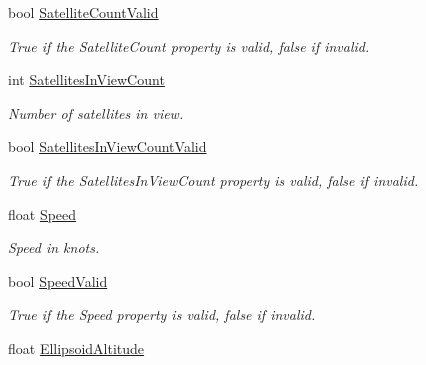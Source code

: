 \begin{DoxyCompactItemize}
bool \hyperlink{class_g_p_s_mobile_1_1_gps_position_af911c9eb00e8dab5c549e53748d3389a}{SatelliteCountValid}
\begin{DoxyCompactList}\small\item\em True if the SatelliteCount property is valid, false if invalid. \item\end{DoxyCompactList}\item 
int \hyperlink{class_g_p_s_mobile_1_1_gps_position_af125dc9f8b26690269c08483d1b7ffb0}{SatellitesInViewCount}
\begin{DoxyCompactList}\small\item\em Number of satellites in view. \item\end{DoxyCompactList}\item 
bool \hyperlink{class_g_p_s_mobile_1_1_gps_position_a3a358ef10fea4c956bc5db879a18e89d}{SatellitesInViewCountValid}
\begin{DoxyCompactList}\small\item\em True if the SatellitesInViewCount property is valid, false if invalid. \item\end{DoxyCompactList}\item 
float \hyperlink{class_g_p_s_mobile_1_1_gps_position_aa6394677dc38656297fc26de38da88ee}{Speed}
\begin{DoxyCompactList}\small\item\em Speed in knots. \item\end{DoxyCompactList}\item 
bool \hyperlink{class_g_p_s_mobile_1_1_gps_position_a2f8d5434c3526194ee0c1ebd42481f2b}{SpeedValid}
\begin{DoxyCompactList}\small\item\em True if the Speed property is valid, false if invalid. \item\end{DoxyCompactList}\item 
float \hyperlink{class_g_p_s_mobile_1_1_gps_position_ad91c88bac71cc38c4a69a3e554abe6e4}{EllipsoidAltitude}

\end{DoxyCompactItemize}
